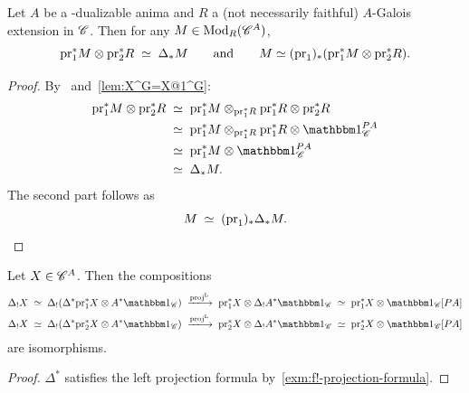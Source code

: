 \documentclass[english,svgnames,table]{article}
\begin{document}
    \begin{corollary}
    \label{cor:M@R=M^G}
        Let $A$ be a \COB-dualizable anima and $R$ a (not necessarily faithful) $A$-Galois extension in $\mathscr{C}$.
        Then for any $M \in \operatorname{Mod}_R(\mathscr{C}^A)$,
        \begin{equation*}
            \mathrm{pr}_1^* M \otimes \mathrm{pr}_2^* R \;\simeq\; \Delta_* M \qquad \text{and} \qquad M \simeq (\mathrm{pr}_1)_* (\mathrm{pr}_1^* M \otimes \mathrm{pr}_2^* R).
        \end{equation*}
    \end{corollary}
    \begin{proof}
        By~ and~\cref{lem:X^G=X@1^G}:
        \begin{equation*}
            \begin{split}
                \pr_1^* M \otimes \pr_2^* R 
                & \;\simeq\; \pr_1^* M \otimes_{\pr_1^* R} \pr_1^* R \otimes \pr_2^* R \\
                & \;\simeq\; \pr_1^* M \otimes_{\pr_1^* R} \pr_1^* R \otimes \ounit_{\cC}^{\Path A} \\
                & \;\simeq\; \pr_1^* M \otimes \ounit_{\cC}^{\Path A} \\
                & \;\simeq\; \Delta_* M.
            \end{split}
        \end{equation*}
        The second part follows as
        \begin{equation*}
            M \;\simeq\; (\mathrm{pr}_1)_* \Delta_* M.
        \end{equation*}
    \end{proof}

    
    \begin{lemma}
    \label{lem:free-induced-splits}
        Let $X\in \mathscr{C}^A$. Then the compositions
        \begin{equation*}
            \begin{split}
                & \Delta_! X \;\simeq\; \Delta_!(\Delta^* \pr_1^* X \otimes A^* \ounit_{\cC}) \;\xtoo{\Lproj}\; \pr_1^* X \otimes \Delta_! A^* \ounit_{\cC} \;\simeq\; \pr_1^* X \otimes \ounit_{\cC}[\Path A] \\
                & \Delta_! X \;\simeq\; \Delta_!(\Delta^* \pr_2^* X \otimes A^* \ounit_{\cC}) \;\xtoo{\Lproj}\; \pr_2^* X \otimes \Delta_! A^* \ounit_{\cC} \;\simeq\; \pr_2^* X \otimes \ounit_{\cC}[\Path A]
            \end{split}
        \end{equation*}
        are isomorphisms.
    \end{lemma}
    \begin{proof}
        $\Delta^*$ satisfies the left projection formula by~\cref{exm:f!-projection-formula}.
    \end{proof}
\end{document}
